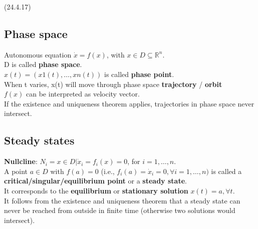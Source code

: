     \begin{example}
    \end{example}
    \begin{lecture}
      (24.4.17)
    \end{lecture}
    \subsection{Phase space}
      Autonomous equation $\dot{x}=f(x)$, with $x \in D \subseteq \mathbb{R}^n$. \\
      D is called \textbf{phase space}. \\
      $x(t) = (x1(t), \dots ,xn(t))$ is called \textbf{phase point}. \\
      When t varies, x(t) will move through phase space \textbf{trajectory} / \textbf{orbit} \\
      $f(x)$ can be interpreted as velocity vector. \\
      If the existence and uniqueness theorem applies, trajectories in phase space never intersect.
    \subsection{Steady states}
      \textbf{Nullcline}: $N_i = {x \in D | \dot{x}_i = f_i(x) = 0}$, for $i = 1, \dots , n$. \\
      A point $a \in D$ with $f(a) = 0$ (i.e., $f_i(a) = \dot{x}_i = 0, \forall i = 1, \dots ,n)$
      is called a \textbf{critical/singular/equilibrium point} or a \textbf{steady state}. \\
      It corresponds to the \textbf{equilibrium} or \textbf{stationary solution}
      $x(t) = a, \forall t$. \\
      It follows from the existence and uniqueness theorem that a steady state can never
      be reached from outside in finite time (otherwise two solutions would intersect).

